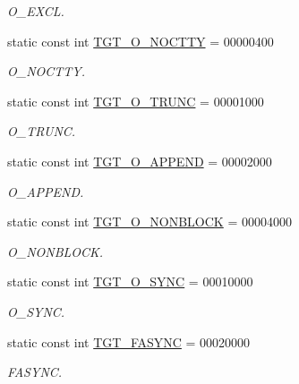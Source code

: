 \begin{DoxyCompactItemize}
\begin{DoxyCompactList}\small\item\em O\_\-EXCL. \item\end{DoxyCompactList}\item 
static const int \hyperlink{classArmLinux64_adfd4240281579e5f60c5e22c601225d8}{TGT\_\-O\_\-NOCTTY} = 00000400
\begin{DoxyCompactList}\small\item\em O\_\-NOCTTY. \item\end{DoxyCompactList}\item 
static const int \hyperlink{classArmLinux64_a4f892ee6e1424a2becd859b0bef1f18b}{TGT\_\-O\_\-TRUNC} = 00001000
\begin{DoxyCompactList}\small\item\em O\_\-TRUNC. \item\end{DoxyCompactList}\item 
static const int \hyperlink{classArmLinux64_af11adc5404ea3780a5ce2829cc3710b7}{TGT\_\-O\_\-APPEND} = 00002000
\begin{DoxyCompactList}\small\item\em O\_\-APPEND. \item\end{DoxyCompactList}\item 
static const int \hyperlink{classArmLinux64_a0ea5420b4c9b45ba342a266fb77ac942}{TGT\_\-O\_\-NONBLOCK} = 00004000
\begin{DoxyCompactList}\small\item\em O\_\-NONBLOCK. \item\end{DoxyCompactList}\item 
static const int \hyperlink{classArmLinux64_abf43ab05d2a5b6b8113952160d8565db}{TGT\_\-O\_\-SYNC} = 00010000
\begin{DoxyCompactList}\small\item\em O\_\-SYNC. \item\end{DoxyCompactList}\item 
static const int \hyperlink{classArmLinux64_ab23d73086673a1279fc508b68fc47191}{TGT\_\-FASYNC} = 00020000
\begin{DoxyCompactList}\small\item\em FASYNC. \item\end{DoxyCompactList}\item 

\end{DoxyCompactItemize}
